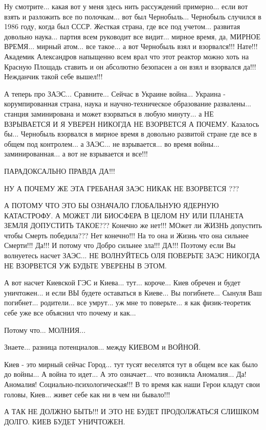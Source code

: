 Ну смотрите... какая вот у меня здесь нить рассуждений примерно... если вот взять и разложить все по полочкам... 
вот был Чернобыль... Чернобыль случился в 1986 году, когда был СССР.
Жесткая страна, где все под учетом... развитая довольно наука... партия всем руководит все видит...
мирное время, да, МИРНОЕ ВРЕМЯ... мирный атом... все такое... а вот Чернобыль взял и взорвался!!!
Нате!!! Академик Александров напыщенно всем врал что этот реактор можно хоть на Красную Площадь ставить
и он абсолютно безопасен а он взял и взорвался да!!! Нежданчик такой себе вышел!!!

А теперь про ЗАЭС... Сравните... Сейчас в Украине война... Украина - корумпированная страна, наука и научно-техническое образование развалены...
станция заминирована и может взорваться в любую
минуту... а НЕ ВЗРЫВАЕТСЯ И Я УВЕРЕН НИКОГДА НЕ ВЗОРВЕТСЯ А ПОЧЕМУ.
Казалось бы... Чернобыль взорвался в мирное время в довольно развитой стране где все в общем под контролем...
а ЗАЭС... не взрывается... во время войны... заминированная... а вот не взрывается и все!!!

ПАРАДОКСАЛЬНО ПРАВДА ДА!!!

НУ А ПОЧЕМУ ЖЕ ЭТА ГРЕБАНАЯ ЗАЭС НИКАК НЕ ВЗОРВЕТСЯ ??? 

А ПОТОМУ ЧТО ЭТО БЫ ОЗНАЧАЛО ГЛОБАЛЬНУЮ ЯДЕРНУЮ КАТАСТРОФУ. А МОЖЕТ ЛИ БИОСФЕРА В ЦЕЛОМ 
НУ ИЛИ ПЛАНЕТА ЗЕМЛЯ ДОПУСТИТЬ ТАКОЕ??? Конечно же нет!!! МОжет ли ЖИЗНЬ допустить чтобы Смерть победила???
Нет конечно!!! На то она и Жизнь что она сильнее Смерти!!! Да!!! И потому что Добро сильнее зла!!! ДА!!!
Поэтому если Вы волнуетесь насчет ЗАЭС... НЕ ВОЛНУЙТЕСЬ ОЛЯ ПОВЕРЬТЕ ЗАЭС НИКОГДА НЕ ВЗОРВЕТСЯ УЖ БУДЬТЕ УВЕРЕНЫ В ЭТОМ.

А вот насчет Киевской ГЭС и Киева... тут... короче... Киев обречен и будет уничтожен... 
и если ВЫ будете оставаться в Киеве... Вы погибнете... Сынуля Ваш погибнет... родители... все умрут...
уж мне то поверьте... я как физик-теоретик себе уже все объяснил что почему и как... 

Потому что... МОЛНИЯ...

Знаете... разница потенциалов... между КИЕВОМ и ВОЙНОЙ.

Киев - это мирный сейчас Город... тут тусят веселятся тут в общем все как было до войны...
А война то идет... А это означает... что возникла Аномалия... Да! Аномалия! Социально-психологическая!!!
В то время как наши Герои кладут свои головы, Киев... живет себе как ни в чем ни бывало!!!

А ТАК НЕ ДОЛЖНО БЫТЬ!!! И ЭТО НЕ БУДЕТ ПРОДОЛЖАТЬСЯ СЛИШКОМ ДОЛГО. КИЕВ БУДЕТ УНИЧТОЖЕН.

